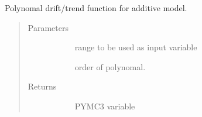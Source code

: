 \documentclass[letterpaper,10pt,english]{sphinxmanual}
\begin{document}
\begin{fulllineitems}
\label{\detokenize{autoapi/src/model/model/index:src.model.model.drift_model}}
Polynomal drift/trend function for additive model.
\begin{quote}\begin{description}
\item[{Parameters}] \leavevmode\begin{description}
\item[{}] \leavevmode{[}\sphinxhref{https://docs.python.org/3/library/stdtypes.html\#range}{\sphinxcode{\sphinxupquote{range}}}{]}
range to be used as input variable

\item[{}] \leavevmode{[}\sphinxhref{https://docs.python.org/3/library/functions.html\#int}{\sphinxcode{\sphinxupquote{int}}}{]}
order of polynomal.

\end{description}

\item[{Returns}] \leavevmode\begin{description}
\item[{}] \leavevmode
PYMC3 variable

\end{description}

\end{description}\end{quote}

\end{fulllineitems}

\end{document}

